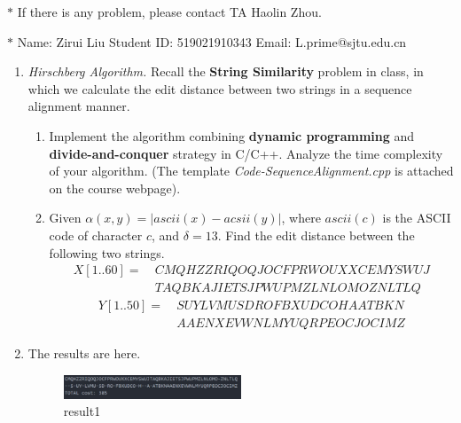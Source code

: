 \documentclass[12pt,a4paper]{article}
\makeatletter
\newtheorem*{solution}{Solution}
\theoremstyle{definition}
\renewenvironment{solution}[1][Solution] {\par\pushQED{\qed}\normalfont\topsep6\p@\@plus6\p@\relax\trivlist\item[\hskip\labelsep\bfseries#1\@addpunct{.}]\ignorespaces}{\popQED\endtrivlist\@endpefalse} \makeatother
\makeatother
\begin{document}
\noindent

\noindent{}
\begin{center}
\footnotesize{\color{red}$*$ If there is any problem, please contact TA Haolin Zhou.}

\footnotesize{\color{blue}$*$ Name: Zirui Liu  \quad Student ID: 519021910343 \quad Email: L.prime@sjtu.edu.cn}
\end{center}

\begin{enumerate}
    \item
    \textit{Hirschberg Algorithm.} Recall the \textbf{String Similarity} problem in class, in which we calculate the edit distance between two strings in a sequence alignment manner.
    \begin{enumerate}
    	\item
    	Implement the algorithm combining \textbf{dynamic programming} and \textbf{divide-and-conquer} strategy in C/C++. Analyze the time complexity of your algorithm. {\color{blue}(The template \emph{Code-SequenceAlignment.cpp} is attached on the course webpage)}.
    	
    	\item
    	Given $\alpha(x, y) = |ascii(x) - acsii(y)|$, where $ascii(c)$ is the ASCII code of character $c$, and $\delta=13$. Find the edit distance between the following two strings.
    	\begin{align*}
    		X[1..60]=&\ CMQHZZRIQOQJOCFPRWOUXXCEMYSWUJ\\
    		&\ TAQBKAJIETSJPWUPMZLNLOMOZNLTLQ	
    	\end{align*}
    	\begin{align*}
    		Y[1..50]=&\ SUYLVMUSDROFBXUDCOHAATBKN\\
    		&\ AAENXEVWNLMYUQRPEOCJOCIMZ
    	\end{align*}
    \end{enumerate}
    \begin{solution}
    The results are here.\\
    \begin{figure}[H] %
    \centering %
    \includegraphics[width=0.5\textwidth]{result1.pdf}
    \caption{result1} %
    \label{} %
    \end{figure}
    

\end{solution}
\end{enumerate}
\end{document}
